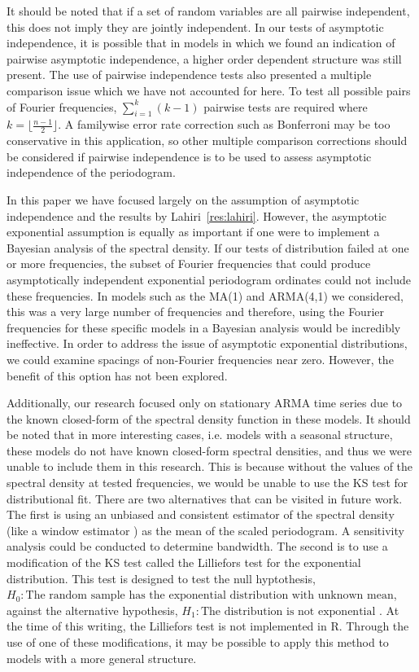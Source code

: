 \documentclass{article}\usepackage{graphicx, color}
\theoremstyle{plain}
\begin{document}
It should be noted that if a set of random variables are all pairwise independent, this does not imply they are jointly independent. In our tests of asymptotic independence, it is possible that in models in which we found an indication of pairwise asymptotic independence, a higher order dependent structure was still present. The use of pairwise independence tests also presented a multiple comparison issue which we have not accounted for here. To test all possible pairs of Fourier frequencies, $\sum_{i=1}^k (k-1)$ pairwise tests are required where $k=\lfloor\frac{n-1}{2}\rfloor$. A familywise error rate correction such as Bonferroni may be too conservative in this application, so other multiple comparison corrections should be considered if pairwise independence is to be used to assess asymptotic independence of the periodogram.

In this paper we have focused largely on the assumption of asymptotic independence and the results by Lahiri~\ref{res:lahiri}. However, the asymptotic exponential assumption is equally as important if one were to implement a Bayesian analysis of the spectral density. If our tests of distribution failed at one or more frequencies, the subset of Fourier frequencies that could produce asymptotically independent exponential periodogram ordinates could not include these frequencies. In models such as the MA(1) and ARMA(4,1) we considered, this was a very large number of frequencies and therefore, using the Fourier frequencies for these specific models in a Bayesian analysis would be incredibly ineffective. In order to address the issue of asymptotic exponential distributions, we could examine spacings of non-Fourier frequencies near zero. However, the benefit of this option has not been explored.

Additionally, our research focused only on stationary ARMA time series due to the known closed-form of the spectral density function in these models. It should be noted that in more interesting cases, i.e. models with a seasonal structure, these models do not have known closed-form spectral densities, and thus we were unable to include them in this research. This is because without the values of the spectral density at tested frequencies, we would be unable to use the KS test for distributional fit. There are two alternatives that can be visited in future work. The first is using an unbiased and consistent estimator of the spectral density (like a window estimator \cite{brockwell2002introduction}) as the mean of the scaled periodogram. A sensitivity analysis could be conducted to determine bandwidth. The second is to use a modification of the KS test called the Lilliefors test for the exponential distribution. This test is designed to test the null hyptothesis, $H_0: \text{The random sample has the exponential distribution with unknown mean}$, against the alternative hypothesis, $H_1: \text{The distribution is not exponential}$ \cite{conover1998practical}. At the time of this writing, the Lilliefors test is not implemented in R. Through the use of one of these modifications, it may be possible to apply this method to models with a more general structure.
\end{document}
